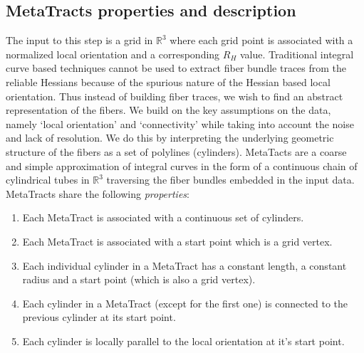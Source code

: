 \subsection {MetaTracts properties and description} 
\label{subsec:mtprop}
The input to this step is a grid in $\mathbb{R}^3$ where each grid point is associated with a normalized local orientation and a corresponding $R_H$ value.
Traditional integral curve based techniques cannot be used to extract fiber bundle traces from the reliable Hessians because of the spurious nature of the Hessian based local orientation. Thus instead of building fiber traces, we wish to find an abstract representation of the fibers. We build on the key assumptions on the data, namely `local orientation' and `connectivity' while taking into account the noise and lack of resolution. We do this by interpreting the underlying geometric structure of the fibers as a set of polylines (cylinders). MetaTacts  are a coarse and simple approximation of integral curves in the form of a continuous chain of cylindrical tubes in $\mathbb{R}^3$ traversing the fiber bundles embedded in the input data. MetaTracts share the following \textit{properties}:

\begin{enumerate}[noitemsep]
\item{Each MetaTract is associated with a continuous set of cylinders.}
\item{Each MetaTract is associated with a start point which is a grid vertex.}
\item{Each individual cylinder in a MetaTract has a constant length, a constant radius and a start point (which is also a grid vertex).}
\item{Each cylinder in a MetaTract (except for the first one) is connected to the previous cylinder at its start point.}
\item{Each cylinder is locally parallel to the local orientation at it's start point.}
\end{enumerate}



